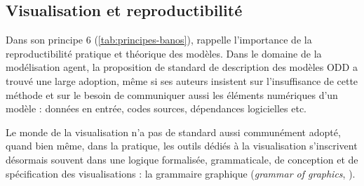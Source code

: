 \documentclass[a4paper, 12pt]{article}
\begin{document}

\subsection{Visualisation et reproductibilité\label{subsec:reproductibilite}}

Dans son principe 6 (\cref{tab:principes-banos}),  rappelle l'importance de la reproductibilité pratique et théorique des modèles.
Dans le domaine de la modélisation agent, la proposition de standard de description des modèles \og ODD\fg{} \autocite{grimm_documenting_2017} a trouvé une large adoption, même si ses auteurs insistent sur l'insuffisance de cette méthode et sur le besoin de communiquer aussi les éléments numériques d'un modèle : données en entrée, codes sources, dépendances logicielles etc.

Le monde de la visualisation n'a pas de standard aussi communément adopté, quand bien même, dans la pratique, les outils dédiés à la visualisation s'inscrivent désormais souvent dans une logique formalisée, \og grammaticale\fg{}, de conception et de spécification des visualisations : la \og grammaire graphique\fg{} (\og \textit{grammar of graphics}\fg{}, \cite{wilkinson_grammar_2006}).
\end{document}
